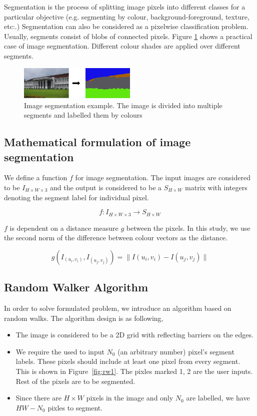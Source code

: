 \documentclass[a4paper]{article}
\newcommand\figref{Figure~\ref}
\begin{document}
Segmentation is the process of splitting image pixels into different classes for a particular objective (e.g. segmenting by colour, background-foreground, texture, etc:.) Segmentation can also be considered as a pixelwise classification problem.\\
Usually, segments consist of blobs of connected pixels. Figure \ref{fig:img-segmentation-example} shows a practical case of image segmentation. Different colour shades are applied over different segments.\\

\begin{figure}[h]
    \centering
    \includegraphics[width=0.5\textwidth]{image-segmentation.png}
    \caption{Image segmentation example. The image is divided into multiple segments and labelled them by colours}
    \label{fig:img-segmentation-example}
\end{figure}

\subsection{Mathematical formulation of image segmentation}
We define a function $f$ for image segmentation. The input images are considered to be $I_{H\times W\times 3}$ and the output is considered to be a $S_{H\times W}$ matrix with integers denoting the segment label for individual pixel.

$$f : I_{H\times W\times 3} \longrightarrow S_{H\times W}$$

$f$ is dependent on a distance measure $g$ between the pixels. In this study, we use the second norm of the difference between colour vectors as the distance. 

$$g(I_{(u_i,v_i)},I_{(u_j,v_j)}) = \|I(u_i,v_i) - I(u_j,v_j) \| $$


\subsection{Random Walker Algorithm}

In order to solve formulated problem, we introduce an algorithm based on random walks. The algorithm design is as following,
\begin{itemize}
    \item The image is considered to be a 2D grid with reflecting barriers on the edges.
    \item We require the used to input $N_0$ (an arbitrary number) pixel's segment labels. These pixels should include at least one pixel from every segment. This is shown in \figref{fig:rw1}. The pixles marked 1, 2 are the user inputs. Rest of the pixels are to be segmented.
    \item Since there are $H\times W$ pixels in the image and only $N_0$ are labelled, we have $HW - N_0$ pixles to segment.
\end{itemize}
\end{document}
